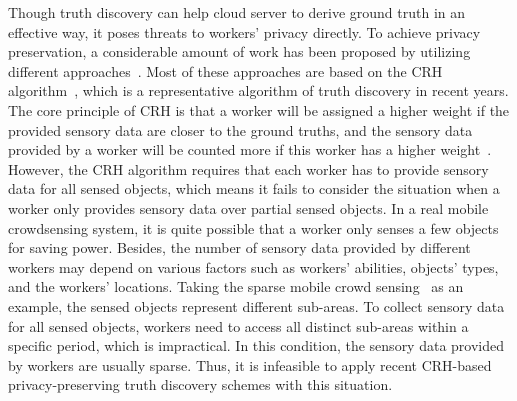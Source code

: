 \documentclass[conference]{IEEEtran}
\begin{document}
Though truth discovery can help cloud server to derive ground truth in an effective way, it poses threats to workers' privacy directly.
To achieve privacy preservation, a considerable amount of work has been proposed by utilizing different approaches~\cite{miao_cloud-enabled_2015,miao_lightweight_2017,xu_efficient_2019,zhang_reliable_2019,xue_inpptd_2020}.
Most of these approaches are based on the CRH algorithm~\cite{li_resolving_2014}, which is a representative algorithm of truth discovery in recent years.
The core principle of CRH is that a worker will be assigned a higher weight if the provided sensory data are closer to the ground truths, and the sensory data provided by a worker will be counted more if this worker has a higher weight~\cite{xu_efficient_2019}.
However, the CRH algorithm requires that each worker has to provide sensory data for all sensed objects, which means it fails to consider the situation when a worker only provides sensory data over partial sensed objects.
In a real mobile crowdsensing system, it is quite possible that a worker only senses a few objects for saving power.
Besides, the number of sensory data provided by different workers may depend on various factors such as workers' abilities, objects' types, and the workers' locations.
Taking the sparse mobile crowd sensing~\cite{wang_sparse_2016} as an example, the sensed objects represent different sub-areas.
To collect sensory data for all sensed objects, workers need to access all distinct sub-areas within a specific period, which is impractical.
In this condition, the sensory data provided by workers are usually sparse.
Thus, it is infeasible to apply recent CRH-based privacy-preserving truth discovery schemes with this situation.
\end{document}
